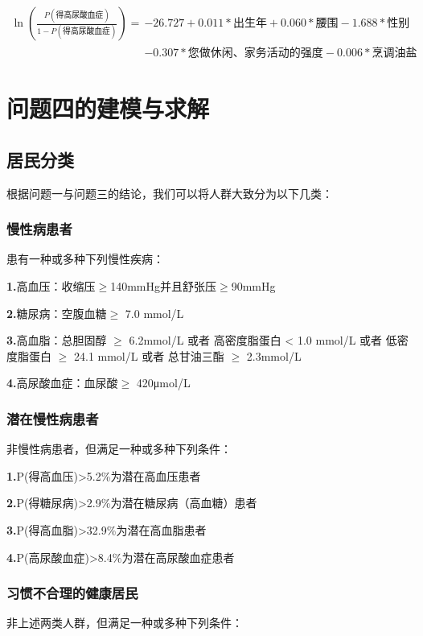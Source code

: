 \documentclass{article}
\numberwithin{equation}{subsection}
\begin{document}
\begin{equation*}
    \begin{aligned}
        \ln(\frac{P(\text{得高尿酸血症})}{1-P(\text{得高尿酸血症})})
        =&-26.727 + 0.011*\text{出生年} + 0.060*\text{腰围}-1.688*\text{性别}\\
        &-0.307*\text{您做休闲、家务活动的强度}-0.006*\text{烹调油盐}
    \end{aligned}
\end{equation*}

{\centering\section{问题四的建模与求解}}
\subsection{居民分类}
根据问题一与问题三的结论，我们可以将人群大致分为以下几类：
\subsubsection{慢性病患者}
患有一种或多种下列慢性疾病：

\textbf{1.}高血压：收缩压$\geq$140mmHg并且舒张压$\geq$90mmHg

\textbf{2.}糖尿病：空腹血糖$\geq$ 7.0 mmol/L

\textbf{3.}高血脂：总胆固醇 $\geq$ 6.2mmol/L 或者 高密度脂蛋白 < 1.0 mmol/L 或者 低密度脂蛋白 $\geq$ 24.1 mmol/L 或者 总甘油三酯 $\geq$ 2.3mmol/L

\textbf{4.}高尿酸血症：血尿酸$\geq$ 420μmol/L

\subsubsection{潜在慢性病患者}
非慢性病患者，但满足一种或多种下列条件：

\textbf{1.}P(得高血压)>5.2\%为潜在高血压患者

\textbf{2.}P(得糖尿病)>2.9\%为潜在糖尿病（高血糖）患者

\textbf{3.}P(得高血脂)>32.9\%为潜在高血脂患者

\textbf{4.}P(高尿酸血症)>8.4\%为潜在高尿酸血症患者

\subsubsection{习惯不合理的健康居民}
非上述两类人群，但满足一种或多种下列条件：
\end{document}

